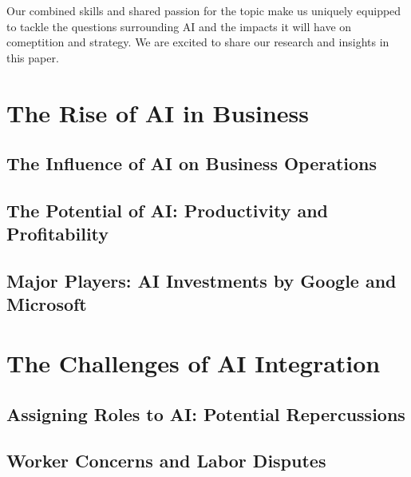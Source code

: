 \documentclass[
]{book}
\begin{document}
Our combined skills and shared passion for the topic make us uniquely equipped to tackle the questions surrounding AI and the impacts it will have on comeptition and strategy. We are excited to share our research and insights in this paper.

\hypertarget{the-rise-of-ai-in-business}{%
\chapter{The Rise of AI in Business}\label{the-rise-of-ai-in-business}}

\hypertarget{the-influence-of-ai-on-business-operations}{%
\section{The Influence of AI on Business Operations}\label{the-influence-of-ai-on-business-operations}}

\hypertarget{the-potential-of-ai-productivity-and-profitability}{%
\section{The Potential of AI: Productivity and Profitability}\label{the-potential-of-ai-productivity-and-profitability}}

\hypertarget{major-players-ai-investments-by-google-and-microsoft}{%
\section{Major Players: AI Investments by Google and Microsoft}\label{major-players-ai-investments-by-google-and-microsoft}}

\hypertarget{the-challenges-of-ai-integration}{%
\chapter{The Challenges of AI Integration}\label{the-challenges-of-ai-integration}}

\hypertarget{assigning-roles-to-ai-potential-repercussions}{%
\section{Assigning Roles to AI: Potential Repercussions}\label{assigning-roles-to-ai-potential-repercussions}}

\hypertarget{worker-concerns-and-labor-disputes}{%
\section{Worker Concerns and Labor Disputes}\label{worker-concerns-and-labor-disputes}}
\end{document}
